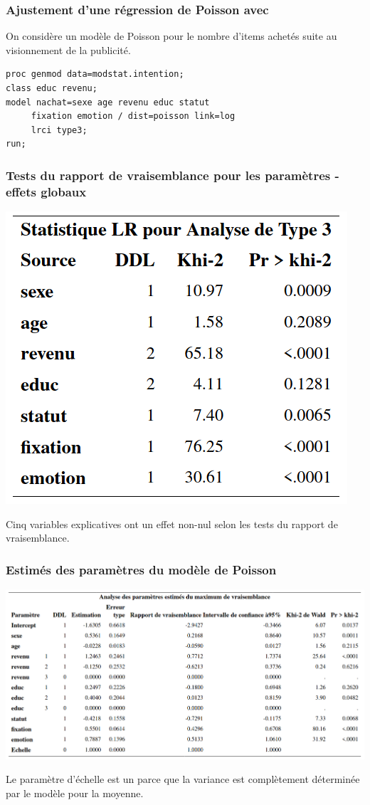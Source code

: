\documentclass{beamer}
\begin{document}
\begin{frame}[fragile]
\frametitle{Ajustement d'une régression de Poisson avec }

 On considère un modèle de Poisson pour le nombre d'items achetés suite au visionnement de la publicité.
\begin{tcolorbox}[colback=white, colframe=hecblue, title=Code \SASlang{} pour ajuster une régression Poisson]
\begin{verbatim}
proc genmod data=modstat.intention;
class educ revenu;
model nachat=sexe age revenu educ statut
     fixation emotion / dist=poisson link=log 
     lrci type3;
run;
\end{verbatim}
\end{tcolorbox}
\end{frame}

\begin{frame}[fragile]
\frametitle{Tests du rapport de vraisemblance pour les paramètres - effets globaux}
\begin{center}
\includegraphics[width = 0.5\linewidth]{img/c4/diapos8-e4}
\end{center}
Cinq variables explicatives ont un effet non-nul selon les tests du rapport de vraisemblance.
\end{frame}


\begin{frame}[fragile]
\frametitle{Estimés des paramètres du modèle de Poisson}
\begin{center}
\includegraphics[width = 0.99\linewidth]{img/c4/diapos8-e5}
\end{center}
{\footnotesize
Le paramètre d'échelle est un parce que la variance est complètement déterminée par le modèle pour la moyenne.

}
\end{frame}
\end{document}
